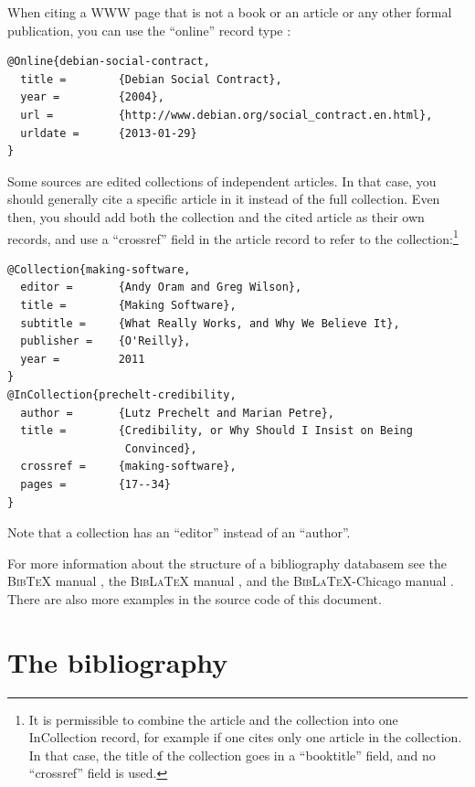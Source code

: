 \documentclass[utf8,bachelor,english]{gradu3}
\begin{document}
When citing a WWW page that is not a book or an article or any other
formal publication, you can use the ``online'' record
type \parencite[eg.][]{debian-social-contract}:

\begingroup\footnotesize
\begin{verbatim}
@Online{debian-social-contract,
  title =        {Debian Social Contract},
  year =         {2004},
  url =          {http://www.debian.org/social_contract.en.html},
  urldate =      {2013-01-29}
}
\end{verbatim}
\endgroup

Some sources are edited collections of independent articles.  In that
case, you should generally cite a specific article in
it \parencite[eg.][]{prechelt-credibility} instead of the full
collection.  Even then, you should add both the collection and the
cited article as their own records, and use a ``crossref'' field in
the article record to refer to the collection:\footnote{It is
  permissible to combine the article and the collection into one
  InCollection record, for example if one cites only one article in
  the collection.  In that case, the title of the collection goes in a
  ``booktitle'' field, and no ``crossref'' field is used.}

\begingroup\footnotesize
\begin{verbatim}
@Collection{making-software,
  editor =       {Andy Oram and Greg Wilson},
  title =        {Making Software},
  subtitle =     {What Really Works, and Why We Believe It},
  publisher =    {O'Reilly},
  year =         2011
}
@InCollection{prechelt-credibility,
  author =       {Lutz Prechelt and Marian Petre},
  title =        {Credibility, or Why Should I Insist on Being
                  Convinced},
  crossref =     {making-software},
  pages =        {17--34}
}
\end{verbatim}
\endgroup

Note that a collection has an ``editor'' instead of an ``author''.

For more information about the structure of a bibliography databasem
see the \textsc{Bib\TeX} manual \parencite{bibtexing},
the \textsc{Bib\LaTeX} manual \parencite[Section~2]{biblatex-manual},
and the \textsc{Bib\LaTeX}-Chicago manual
\parencite[Sections 5.1--5.2]{biblatex-chicago-manual}.  There are
also more examples in the source code of this document.


\section{The bibliography}
\end{document}
